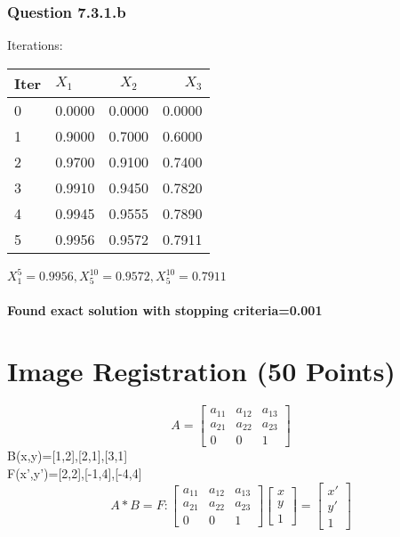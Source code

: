 \documentclass{article}
\begin{document}
\subsubsection{Question 7.3.1.b}
Iterations:
\begin{tabular}{l|l|c|r}
	Iter&$X_{1}$&$X_{2}$&$X_{3}$\\
	\hline
0&  0.0000&  0.0000&  0.0000\\
1&  0.9000&  0.7000&  0.6000\\
2&  0.9700&  0.9100&  0.7400\\
3&  0.9910&  0.9450&  0.7820\\
4&  0.9945&  0.9555&  0.7890\\
5&  0.9956&  0.9572&  0.7911\\
	\hline
\end{tabular}$X_{1}^{5}=0.9956,X_{5}^{10}=0.9572,X_{5}^{10}=0.7911$ \\\\
\textbf{Found exact solution with stopping criteria=0.001}
\section{Image Registration (50 Points)}
\[
A=
\begin{bmatrix}
	a_{11}&a_{12}&a_{13}\\
	a_{21}&a_{22}&a_{23}\\
	0&0&1
\end{bmatrix}
\]
B(x,y)={[1,2],[2,1],[3,1]}\\
F(x',y')={[2,2],[-1,4],[-4,4]}\\

\[
A*B=F : 
\begin{bmatrix}
	a_{11}&a_{12}&a_{13}\\
	a_{21}&a_{22}&a_{23}\\
	0&0&1
\end{bmatrix}
\begin{bmatrix}
	x\\y\\1
\end{bmatrix}
=
\begin{bmatrix}
	x'\\y'\\1
\end{bmatrix}
\]
\end{document}
